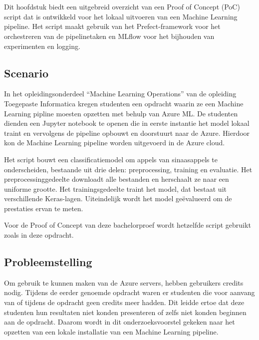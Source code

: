 \chapter{}%
\label{ch:PoC}

Dit hoofdstuk biedt een uitgebreid overzicht van een Proof of Concept (PoC) script dat is ontwikkeld voor het lokaal uitvoeren van een Machine Learning pipeline. Het script maakt gebruik van het Prefect-framework voor het orchestreren van de pipelinetaken en MLflow voor het bijhouden van experimenten en logging.


\section{Scenario}

In het opleidingsonderdeel ``Machine Learning Operations'' van de opleiding Toegepaste Informatica kregen studenten een opdracht waarin ze een Machine Learning pipline moesten opzetten met behulp van Azure ML. De studenten dienden een Jupyter notebook te openen die in eerste instantie het model lokaal traint en vervolgens de pipeline opbouwt en doorstuurt naar de Azure. Hierdoor kon de Machine Learning pipeline worden uitgevoerd in de Azure cloud.

Het script bouwt een classificatiemodel om appels van sinaasappels te onderscheiden, bestaande uit drie delen: preprocessing, training en evaluatie. Het preprocessinggedeelte downloadt alle bestanden en herschaalt ze naar een uniforme grootte. Het trainingsgedeelte traint het model, dat bestaat uit verschillende Keras-lagen. Uiteindelijk wordt het model geëvalueerd om de prestaties ervan te meten.

Voor de Proof of Concept van deze bachelorproef wordt hetzelfde script gebruikt zoals in deze opdracht.

\section{Probleemstelling}


Om gebruik te kunnen maken van de Azure servers, hebben gebruikers credits nodig. Tijdens de eerder genoemde opdracht waren er studenten die voor aanvang van of tijdens de opdracht geen credits meer hadden. Dit leidde ertoe dat deze studenten hun resultaten niet konden presenteren of zelfs niet konden beginnen aan de opdracht. Daarom wordt in dit onderzoeksvoorstel gekeken naar het opzetten van een lokale installatie van een Machine Learning pipeline.

